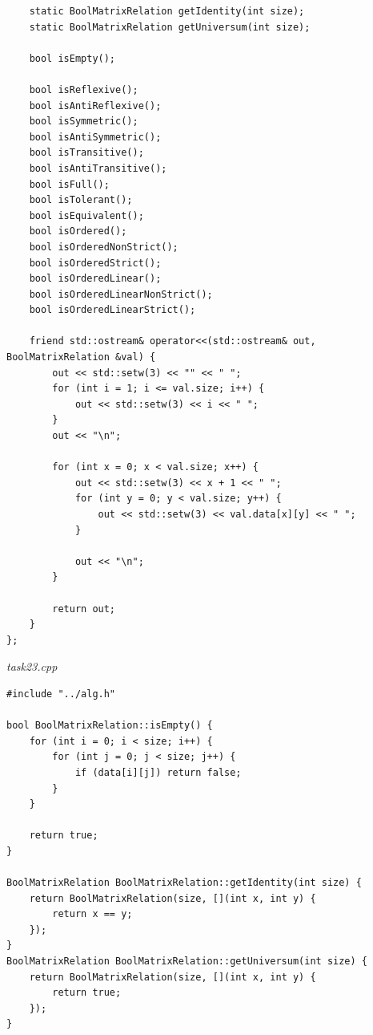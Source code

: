 \documentclass[a4paper,14pt]{extarticle}
\begin{document}
\begin{enumerate}[label=2.\arabic*.]
\begin{verbatim}
	static BoolMatrixRelation getIdentity(int size);
	static BoolMatrixRelation getUniversum(int size);
	
	bool isEmpty();
	
	bool isReflexive();
	bool isAntiReflexive();
	bool isSymmetric();
	bool isAntiSymmetric();
	bool isTransitive();
	bool isAntiTransitive();
	bool isFull();
	bool isTolerant();
	bool isEquivalent();
	bool isOrdered();
	bool isOrderedNonStrict();
	bool isOrderedStrict();
	bool isOrderedLinear();
	bool isOrderedLinearNonStrict();
	bool isOrderedLinearStrict();
	
	friend std::ostream& operator<<(std::ostream& out, BoolMatrixRelation &val) {
		out << std::setw(3) << "" << " ";
		for (int i = 1; i <= val.size; i++) {
			out << std::setw(3) << i << " ";
		}
		out << "\n";
		
		for (int x = 0; x < val.size; x++) {
			out << std::setw(3) << x + 1 << " ";
			for (int y = 0; y < val.size; y++) {
				out << std::setw(3) << val.data[x][y] << " ";
			}
			
			out << "\n";
		}
		
		return out;
	}
};
    	\end{verbatim}
	      \textit{task23.cpp}
	      \begin{verbatim}
#include "../alg.h"

bool BoolMatrixRelation::isEmpty() {
	for (int i = 0; i < size; i++) {
		for (int j = 0; j < size; j++) {
			if (data[i][j]) return false;
		}
	}
	
	return true;
}

BoolMatrixRelation BoolMatrixRelation::getIdentity(int size) {
	return BoolMatrixRelation(size, [](int x, int y) {
		return x == y;
	});
}
BoolMatrixRelation BoolMatrixRelation::getUniversum(int size) {
	return BoolMatrixRelation(size, [](int x, int y) {
		return true;
	});
}


\end{verbatim}
\end{enumerate}
\end{document}
